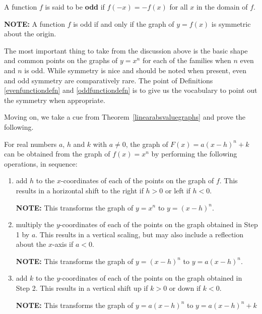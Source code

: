 \documentclass{ximera}
\begin{document}
\begin{definition} \label{oddfunctiondefn} A function $f$ is said to be \textbf{odd} if $f(-x) = -f(x)$ for all $x$ in the domain of $f$.  

\textbf{NOTE:} A function $f$ is odd if and only if  the graph of  $y = f(x)$ is symmetric about the origin.

\end{definition}



The most important thing to take from the discussion above is the basic shape and common points on the graphs of $y = x^n$ for each of the families when $n$ even and $n$ is odd.  While symmetry is nice and should be noted when present, even and odd symmetry are comparatively rare.  The point of Definitions \ref{evenfunctiondefn}  and \ref{oddfunctiondefn} is to give us the vocabulary to point out the symmetry when appropriate.  


Moving on, we take a cue from Theorem~\ref{linearabsvaluegraphs} and prove the following.



\begin{theorem} \label{linearmononialgraphs}  For real numbers $a$, $h$ and $k$ with $a \neq 0$, the graph of $F(x) = a(x-h)^n+k$  can be obtained from the graph of $f(x) = x^n$ by performing the following operations, in sequence:

\begin{enumerate}

\item  add $h$ to the $x$-coordinates of each of the points on the graph of $f$.  This results in a horizontal shift to the right if $h > 0$ or left if $h < 0$.

\textbf{NOTE:}  This transforms the graph of $y = x^n$ to $y = (x-h)^n$.

\item  multiply the $y$-coordinates of each of the points on the graph obtained in Step 1 by $a$.   This results in a vertical scaling, but may also include a reflection about the $x$-axis if $a < 0$.

\textbf{NOTE:}  This transforms the graph of $y = (x-h)^n$ to $y = a(x-h)^n$.

\item  add $k$ to the $y$-coordinates of each of the points on the graph obtained in Step 2.  This results in a vertical shift up if $k > 0$ or down if $k< 0$.

\textbf{NOTE:}  This transforms the graph of  $y = a(x-h)^n$ to $y = a(x-h)^n+k$

\end{enumerate}

\end{theorem}
\end{document}
